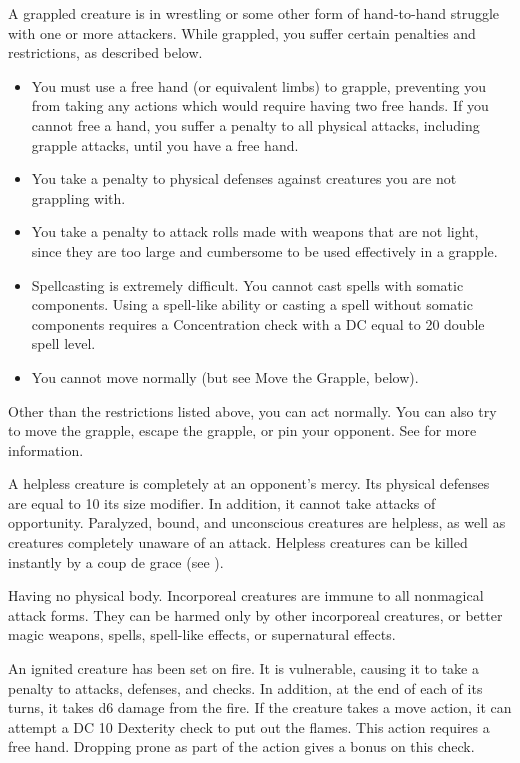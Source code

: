  A grappled creature is in wrestling or some other form of hand-to-hand struggle with one or more attackers. While grappled, you suffer certain penalties and restrictions, as described below.

\begin{itemize}
    \item You must use a free hand (or equivalent limbs) to grapple, preventing you from taking any actions which would require having two free hands. If you cannot free a hand, you suffer a  penalty to all physical attacks, including grapple attacks, until you have a free hand.
    \item You take a  penalty to physical defenses against creatures you are not grappling with.
    \item You take a  penalty to attack rolls made with weapons that are not light, since they are too large and cumbersome to be used effectively in a grapple.
    \item Spellcasting is extremely difficult. You cannot cast spells with somatic components. Using a spell-like ability or casting a spell without somatic components requires a Concentration check with a DC equal to 20 \add double spell level.
    \item You cannot move normally (but see Move the Grapple, below).
\end{itemize}

Other than the restrictions listed above, you can act normally. You can also try to move the grapple, escape the grapple, or pin your opponent. See  for more information.

 A helpless creature is completely at an opponent's mercy. Its physical defenses are equal to 10 \add its size modifier. In addition, it cannot take attacks of opportunity. Paralyzed, bound, and unconscious creatures are helpless, as well as creatures completely unaware of an attack. Helpless creatures can be killed instantly by a coup de grace (see ).

 Having no physical body. Incorporeal creatures are immune to all nonmagical attack forms. They can be harmed only by other incorporeal creatures,  or better magic weapons, spells, spell-like effects, or supernatural effects.

 An ignited creature has been set on fire. It is vulnerable, causing it to take a  penalty to attacks, defenses, and checks. In addition, at the end of each of its turns, it takes d6 damage from the fire. If the creature takes a move action, it can attempt a DC 10 Dexterity check to put out the flames. This action requires a free hand. Dropping prone as part of the action gives a  bonus on this check.

